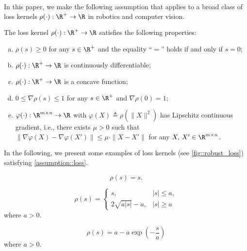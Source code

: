 In this paper, we make the following assumption that applies to a broad class of loss kernels $\rho(\cdot):\R^+\rightarrow\R$ in robotics and computer vision.
\vspace{-0.25em}
\begin{assumption}\label{assumption::loss}
	The loss kernel $\rho(\cdot):\R^+\rightarrow\R$ satisfies the following properties:
	\begin{enumerate}[(a)]
		\item $\rho(s)\geq 0$ for any $s\in\R^+$ and the equality ``$=$'' holds if and only if $s=0$;
		\item $\rho(\cdot):\R^+\rightarrow\R$ is continuously differentiable;\label{assumption::loss_cont}
		\item $\rho(\cdot):\R^+\rightarrow \R$ is a concave function;\label{assumption::loss_mono}
		\item $0\leq\nabla\rho(s)\leq 1$ for any $s\in\R^+$ and $\nabla\rho(0)=1$;\label{assumption::loss_drho}
		\item $\varphi(\cdot):\R^{m\times n}\rightarrow \R$ with $\varphi(X)\triangleq\rho(\|X\|^2)$ has Lipschitz continuous gradient, i.e., there exists $\mu>0$ such that $\|\nabla\varphi(X)-\nabla\varphi(X')\|\leq \mu\cdot\|X-X'\|$ for any $X,\,X'\in\R^{m\times n}$. \label{assumption::loss_L}
	\end{enumerate}
\end{assumption}

In the following, we present some examples of loss kernels (see \cref{fig::robust_loss}) satisfying \cref{assumption::loss}.

\begin{example}\label{example::trivial}
	\begin{equation}\label{eq::trivial}
		\rho(s) =s.
	\end{equation}
\end{example}
\begin{example}\label{example::huber}
	\begin{equation}\label{eq::huber}
		\rho(s) =\begin{cases}
			s, & |s|\leq a,\\
			2\sqrt{a|s|}-a, & |s|\geq a
		\end{cases}
	\end{equation}
	where $a>0$.
\end{example}
\begin{example}\label{example::GM}
	\begin{equation}\label{eq::geman}
		\rho(s) = a - a\exp\left(-\frac{s}{a}\right)
	\end{equation}
	where $a>0$.
\end{example}

